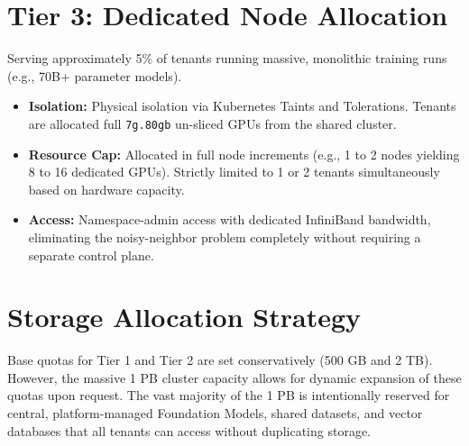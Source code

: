 \section{Tier 3: Dedicated Node Allocation}
Serving approximately 5\% of tenants running massive, monolithic training runs (e.g., 70B+ parameter models).
\begin{itemize}
    \item \textbf{Isolation:} Physical isolation via Kubernetes Taints and Tolerations. Tenants are allocated full \texttt{7g.80gb} un-sliced GPUs from the shared cluster.
    \item \textbf{Resource Cap:} Allocated in full node increments (e.g., 1 to 2 nodes yielding 8 to 16 dedicated GPUs). Strictly limited to 1 or 2 tenants simultaneously based on hardware capacity.
    \item \textbf{Access:} Namespace-admin access with dedicated InfiniBand bandwidth, eliminating the noisy-neighbor problem completely without requiring a separate control plane.
\end{itemize}

\section{Storage Allocation Strategy}
Base quotas for Tier 1 and Tier 2 are set conservatively (500 GB and 2 TB). However, the massive 1 PB cluster capacity allows for dynamic expansion of these quotas upon request. The vast majority of the 1 PB is intentionally reserved for central, platform-managed Foundation Models, shared datasets, and vector databases that all tenants can access without duplicating storage.
